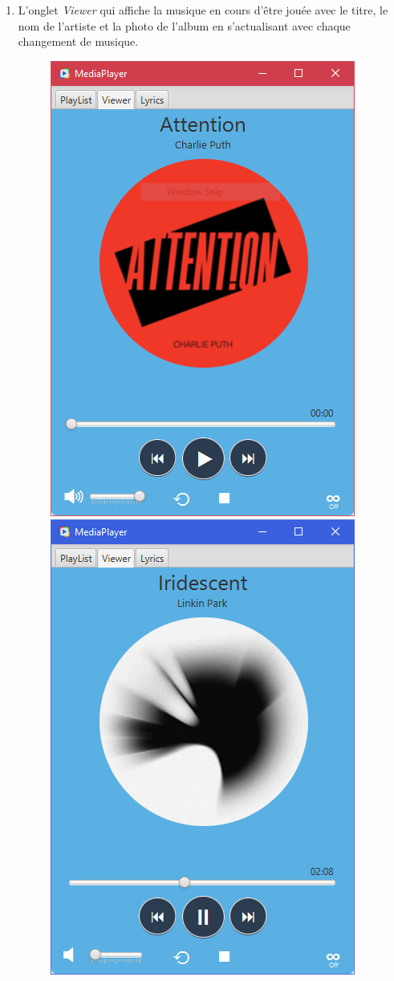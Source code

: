 \documentclass[a4paper,12pt]{report} %
\begin{document}
		\begin{enumerate}
   		\item L'onglet \textit{Viewer} qui affiche la musique en cours d'être jouée avec le titre, le nom de l'artiste et la photo de l'album en s'actualisant avec chaque changement de musique.
   			\begin{figure}[ht] 		
				\centering
  				\includegraphics[scale=0.65]{overView}
  				\hspace{5mm}
  				\includegraphics[scale=0.65]{overView2}
			\end{figure}
			

\end{enumerate}
\end{document}
